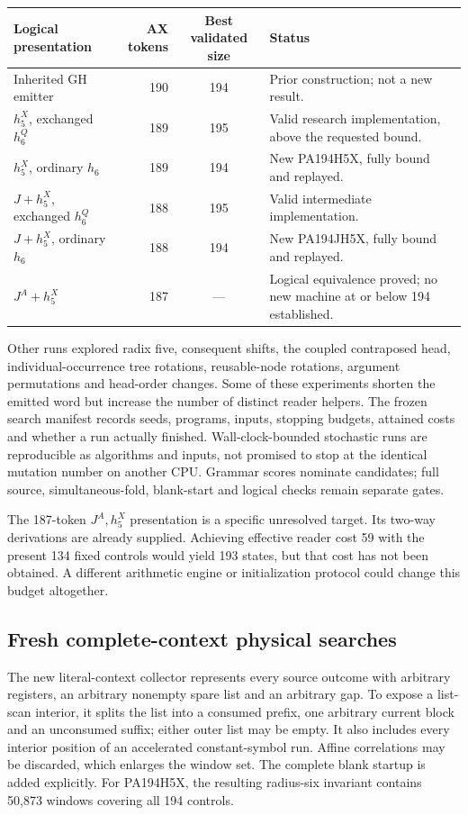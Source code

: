 \begin{center}
\begin{tabularx}{\textwidth}{@{}lrcX@{}}
\toprule
Logical presentation & AX tokens & Best validated size & Status\\\midrule
Inherited GH emitter &190&194&Prior construction; not a new result.\\
$h_5^X$, exchanged $h_6^Q$ &189&195&Valid research implementation, above the requested bound.\\
$h_5^X$, ordinary $h_6$ &189&194&New PA194H5X, fully bound and replayed.\\
$J+h_5^X$, exchanged $h_6^Q$ &188&195&Valid intermediate implementation.\\
$J+h_5^X$, ordinary $h_6$ &188&194&New PA194JH5X, fully bound and replayed.\\
$J^A+h_5^X$ &187&---&Logical equivalence proved; no new machine at or below 194 established.\\
\bottomrule
\end{tabularx}
\end{center}

Other runs explored radix five, consequent shifts, the coupled
contraposed head, individual-occurrence tree rotations, reusable-node
rotations, argument permutations and head-order changes.  Some of these
experiments shorten the emitted word but increase the number of distinct
reader helpers.  The frozen search manifest records seeds, programs,
inputs, stopping budgets, attained costs and whether a run actually
finished.  Wall-clock-bounded stochastic runs are reproducible as
algorithms and inputs, not promised to stop at the identical mutation
number on another CPU.  Grammar scores nominate candidates; full source,
simultaneous-fold, blank-start and logical checks remain separate gates.

The 187-token $J^A,h_5^X$ presentation is a specific unresolved target.
Its two-way derivations are already supplied.  Achieving effective reader
cost 59 with the present 134 fixed controls would yield 193 states, but
that cost has not been obtained.  A different arithmetic engine or
initialization protocol could change this budget altogether.

\subsection{Fresh complete-context physical searches}

The new literal-context collector represents every source outcome with
arbitrary registers, an arbitrary nonempty spare list and an arbitrary
gap.  To expose a list-scan interior, it splits the list into a consumed
prefix, one arbitrary current block and an unconsumed suffix; either
outer list may be empty.  It also includes every interior position of an
accelerated constant-symbol run.  Affine correlations may be discarded,
which enlarges the window set.  The complete blank startup is added
explicitly.  For PA194H5X, the resulting radius-six invariant contains
50,873 windows covering all 194 controls.

